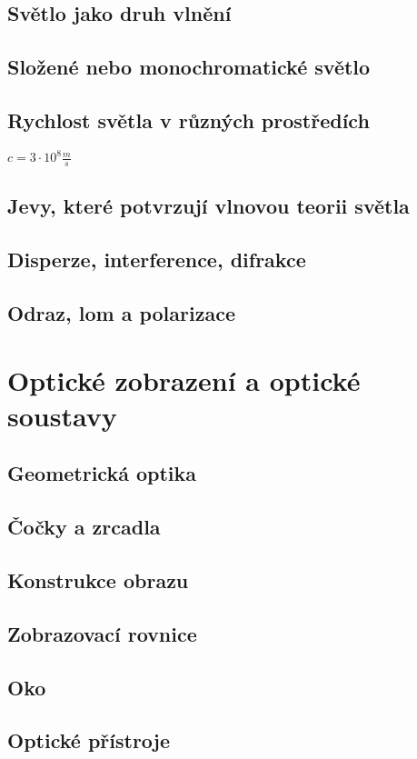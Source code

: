 \documentclass[titlepage]{book}
\begin{document}
\section{Světlo jako druh vlnění}
\section{Složené nebo monochromatické světlo}
\section{Rychlost světla v různých prostředích}
$c = 3 \cdot 10^8 \frac{m}{s}$\\

\section{Jevy, které potvrzují vlnovou teorii světla}
\section{Disperze, interference, difrakce}
\section{Odraz, lom a polarizace}
\chapter{Optické zobrazení a optické soustavy}
\section{Geometrická optika}
\section{Čočky a zrcadla}
\section{Konstrukce obrazu}
\section{Zobrazovací rovnice}
\section{Oko}
\section{Optické přístroje}
\end{document}
